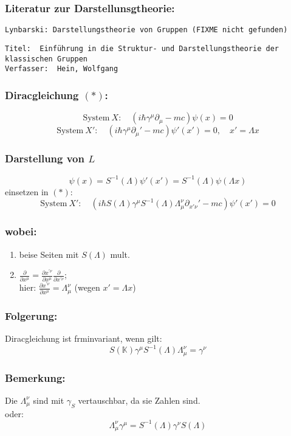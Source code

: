 \documentclass[twoside,a4paper]{scrartcl}
\newcommand{\K}{\mathbb{K}}
\renewcommand{\1}{\mathds{1}}
\renewcommand{\L}{\Lambda}
\begin{document}
\subsubsection*{Literatur zur Darstellunsgtheorie:}
\begin{tiny}
\begin{verbatim}
Lynbarski: Darstellungstheorie von Gruppen (FIXME nicht gefunden)
\end{verbatim}
\end{tiny}


\begin{tiny}
\begin{verbatim}
Titel: 	Einführung in die Struktur- und Darstellungstheorie der klassischen Gruppen
Verfasser: 	Hein, Wolfgang
\end{verbatim}
\end{tiny}

\subsubsection*{Diracgleichung $(*)$:}
$$\mathrm{System} \ X: \quad (i\hbar \gamma^\mu \partial_\mu-mc)\psi(x)=0$$
$$\mathrm{System} \ X': \quad (i\hbar \gamma^\mu \partial_\mu'-mc)\psi'(x')=0, \quad x'=\L x$$
\subsubsection*{Darstellung von $L$}
$$\psi(x)=S^{-1}(\L) \psi'(x')=S^{-1}(\L)\psi(\L x)$$
einsetzen in $(*)$:
$$\mathrm{System} \ X': \quad (i\hbar S(\L)\gamma^\mu S^{-1}(\L) \L_\mu^\nu \partial_{x'\nu}'-mc)\psi'(x')=0$$
\subsubsection*{wobei:}
\begin{enumerate}
\item beise Seiten mit $S(\L)$ mult.
\item $\frac{\partial}{\partial x^\mu}=\frac{\partial x^{'\nu}}{\partial x^\mu}\frac{\partial}{\partial x^{'\nu}}$;\\
hier: $\frac{\partial x^{'\nu}}{\partial x^\mu}=\L_\mu^\nu$ (wegen $x'=\L x$)
\end{enumerate}
\subsubsection*{Folgerung:}
Diracgleichung ist frminvariant, wenn gilt:
$$S(\K) \gamma^\mu S^{-1}(\L) \L_\mu^\nu=\gamma^\nu$$
\subsubsection*{Bemerkung:}
Die $\L_\mu^\nu$ sind mit $\gamma_S$ vertauschbar, da sie Zahlen sind.\\
oder: $$\L_\mu^\nu \gamma^\mu=S^{-1}(\L)\gamma^\nu S(\L)$$
\end{document}
